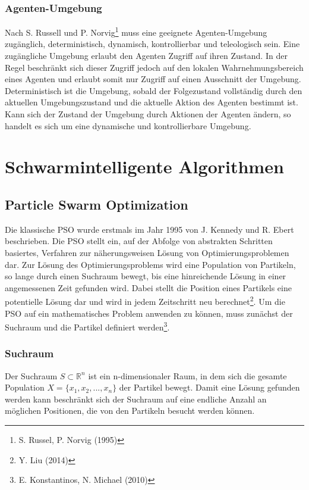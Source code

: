 \documentclass[a4paper, 11pt]{article}
\begin{document}
\subsubsection{Agenten-Umgebung}
Nach S. Russell und P. Norvig\footnote{S. Russel, P. Norvig (1995)} muss eine geeignete Agenten-Umgebung zugänglich, deterministisch, dynamisch, kontrollierbar und teleologisch sein. Eine zugängliche Umgebung erlaubt den Agenten Zugriff auf ihren Zustand. In der Regel beschränkt sich dieser Zugriff jedoch auf den lokalen Wahrnehmungsbereich eines Agenten und erlaubt somit nur Zugriff auf einen Ausschnitt der Umgebung. Deterministisch ist die Umgebung, sobald der Folgezustand vollständig durch den aktuellen Umgebungszustand und die aktuelle Aktion des Agenten bestimmt ist. Kann sich der Zustand der Umgebung durch Aktionen der Agenten ändern, so handelt es sich um eine dynamische und kontrollierbare Umgebung.
\newpage
\section{Schwarmintelligente Algorithmen}
\subsection{Particle Swarm Optimization}
Die klassische \ac{PSO} wurde erstmals im Jahr 1995 von J. Kennedy und R. Ebert beschrieben. Die \acs{PSO} stellt ein, auf der Abfolge von abstrakten Schritten basiertes, Verfahren zur näherungsweisen Lösung von Optimierungsproblemen dar. Zur Lösung des Optimierungsproblems wird eine Population von Partikeln, so lange durch einen Suchraum bewegt, bis eine hinreichende Lösung in einer angemessenen Zeit gefunden wird. Dabei stellt die Position eines Partikels eine potentielle Lösung dar und wird in jedem Zeitschritt neu berechnet\footnote{Y. Liu (2014)}. Um die \acs{PSO} auf ein mathematisches Problem anwenden zu können, muss zunächst der Suchraum und die Partikel definiert werden\footnote{E. Konstantinos, N. Michael (2010)}.
\subsubsection{Suchraum}
Der Suchraum $S \subset \mathbb{R}^n$ ist ein n-dimensionaler Raum, in dem sich die gesamte Population $X=\{x_{1},x_{2},...,x_{n}\}$ der Partikel bewegt. Damit eine Lösung gefunden werden kann beschränkt sich der Suchraum auf eine endliche Anzahl an möglichen Positionen, die von den Partikeln besucht werden können.
\end{document}
